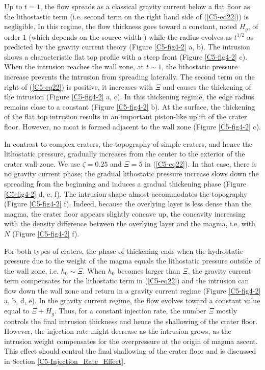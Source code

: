 Up to $t=1$,  the flow spreads as a classical  gravity current below a
flat floor  as the lithostastic term  (i.e.  second term on  the right
hand side of (\ref{C5-eq22})) is  negligible. In this regime, the flow
thickness goes  toward a  constant, noted $H_g$,  of order  $1$ (which
depends on  the source width \citep{Michaut:2009jx})  while the radius
evolves  as  $t^{1/2}$ as  predicted  by  the gravity  current  theory
\citep{Huppert:1982a}  (Figure \ref{C5-fig4-2}  a, b).   The intrusion
shows a  characteristic flat  top profile with  a steep  front (Figure
\ref{C5-fig4-2}  c).  When  the intrusion  reaches the  wall zone,  at
$t\sim1$,  the lithostatic  pressure increase  prevents the  intrusion
from  spreading   laterally.   The  second   term  on  the   right  of
(\ref{C5-eq22}) is  positive, it increases  with $\Xi$ and  causes the
thickening of  the intrusion (Figure  \ref{C5-fig4-2} a, c).   In this
thickening regime, the edge radius remains close to a constant (Figure
\ref{C5-fig4-2} b).   At the surface,  the thickening of the  flat top
intrusion results  in an  important piston-like  uplift of  the crater
floor. However,  no moat is formed  adjacent to the wall  zone (Figure
\ref{C5-fig4-2} c).
		 
In contrast to complex craters,  the topography of simple craters, and
hence the lithostatic pressure, gradually increases from the center to
the exterior of the crater wall zone.  We use $\zeta=0.25$ and $\Xi=5$
in (\ref{C5-eq22}). In  that case, there is no  gravity current phase;
the  gradual lithostatic  pressure increase  slows down  the spreading
from  the beginning  and induces  a gradual  thickening phase  (Figure
\ref{C5-fig4-2} d, e, f).  The intrusion shape almost accommodates the
topography (Figure \ref{C5-fig4-2} f).   Indeed, because the overlying
layer is less dense than the  magma, the crater floor appears slightly
concave  up,  the concavity  increasing  with  the density  difference
between  the overlying  layer and  the  magma, i.e.  with $N$  (Figure
\ref{C5-fig4-2} f).

For  both types  of craters,  the phase  of thickening  ends when  the
hydrostatic  pressure  due to  the  weight  of  the magma  equals  the
lithostatic pressure outside of the wall zone, i.e.  $h_{0} \sim \Xi$.
When  $h_{0} $  becomes larger  than $\Xi$,  the gravity  current term
compensates  for  the  lithostatic  term in  (\ref{C5-eq22})  and  the
intrusion can flow down the wall  zone and return in a gravity current
regime (Figure  \ref{C5-fig4-2} a, b,  d, e).  In the  gravity current
regime, the flow evolves toward a constant value equal to $\Xi + H_g$.
Thus, for a constant injection  rate, the number $\Xi$ mostly controls
the final intrusion  thickness and hence the shallowing  of the crater
floor.  However,  the injection rate  might decrease as  the intrusion
grows, as the intrusion weight compensates for the overpressure at the
origin  of  magma  ascent.   This  effect  should  control  the  final
shallowing  of   the  crater  floor   and  is  discussed   in  Section
\ref{C5-Injection_Rate_Effect}.
	
